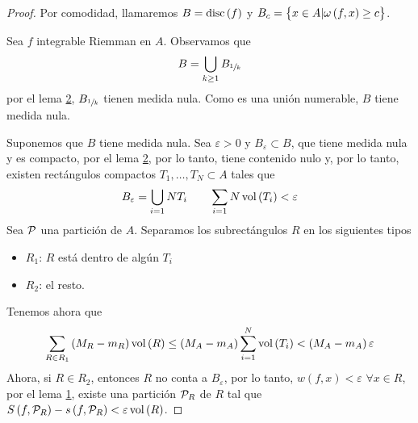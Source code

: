 \begin{proof}
    Por comodidad, llamaremos $B = \operatorname{disc}\left( f \right)$ y $B_c = \left\{x \in A
    \vert \omega\left( f, x \right) \geq c\right\}$.

    \bimplies

    Sea $f$ integrable Riemman en $A$. Observamos que
    \[
        B = \bigcup_{k \geq 1} B_{\sfrac{1}{k}}
    \]
    por el lema \hyperref[lema:dos_lebesgue]{2}, $B_{\sfrac{1}{k}}$ tienen medida
    nula. Como es una unión numerable, $B$ tiene medida nula.

    \bimpliedby

    Suponemos que $B$ tiene medida nula. Sea $\varepsilon > 0$ y $B_\varepsilon
    \subset B$, que tiene medida nula y es compacto, por el lema
    \hyperref[lema:dos_lebesgue]{2}, por lo tanto, tiene contenido nulo y, por lo
    tanto, existen rectángulos compactos $T_1, \dots, T_N \subset A$ tales que
    \[
        B_\varepsilon = \bigcup_{i = 1}{N} T_i \qquad
        \sum_{i=1}{N}\operatorname{vol}\left( T_i \right) < \varepsilon
    \]
    Sea $\mathcal{P}$ una partición de $A$. Separamos los subrectángulos $R$ en los
    siguientes tipos
    \begin{itemize}
        \item $R_1$: $R$ está dentro de algún $T_i$
        \item $R_2$: el resto.
    \end{itemize}

    Tenemos ahora que
    \[
        \sum_{R \in R_1}\left( M_R - m_R \right)\operatorname{vol}\left( R \right) \leq
        \left( M_A -m_A \right)\sum^{N}_{i=1} \operatorname{vol}\left( T_i \right) <
        \left( M_A - m_A \right) \varepsilon
    \]
    Ahora, si $R \in R_2$, entonces $R$ no conta a $B_\varepsilon$, por lo tanto,
    $w(f,x) < \varepsilon$ $\forall x \in R$, por el lema
    \hyperref[lema:uno_lebesgue]{1}, existe una partición $\mathcal{P}_R$ de $R$ tal que
    $S\left( f, \mathcal{P}_R \right) - s\left( f, \mathcal{P}_R \right) < \varepsilon
    \operatorname{vol} \left( R \right)$.
    

\end{proof}
